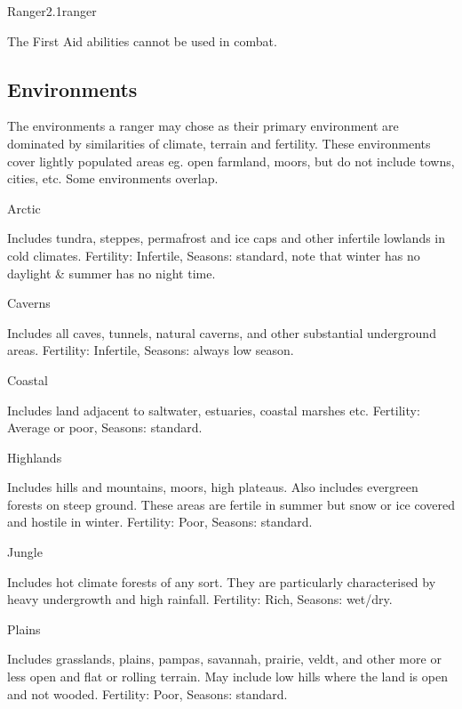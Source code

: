 \begin{skill}{Ranger}{2.1}{ranger}
\begin{Description}
The First Aid abilities cannot be used in combat.
\end{Description}

\subsection{Environments}
\label{ranger:speciality}

The environments a ranger may chose as their primary environment are
dominated by similarities of climate, terrain and fertility.  These
environments cover lightly populated areas eg. open farmland, moors,
but do not include towns, cities, etc.  Some environments overlap.

\begin{Description}
\item[Arctic]

Includes tundra, steppes, permafrost and ice caps and other infertile lowlands in cold climates.  
Fertility: Infertile, Seasons: standard, note that winter has no daylight \& summer has no night time.

\item[Caverns]

Includes all caves, tunnels, natural caverns, and other substantial underground areas.
Fertility: Infertile, Seasons: always low season.

\item[Coastal]

Includes land adjacent to saltwater, estuaries, coastal marshes etc.
Fertility: Average or poor, Seasons: standard.

\item[Highlands]

Includes hills and mountains, moors, high plateaus.  Also includes
evergreen forests on steep ground.  These areas are fertile in summer
but snow or ice covered and hostile in winter.  Fertility: Poor,
Seasons: standard.

\item[Jungle]

Includes hot climate forests of any sort.  They are particularly
characterised by heavy undergrowth and high rainfall.  Fertility:
Rich, Seasons: wet/dry.

\item[Plains]

Includes grasslands, plains, pampas, savannah, prairie, veldt, and
other more or less open and flat or rolling terrain.  May include low
hills where the land is open and not wooded.  Fertility: Poor,
Seasons: standard.


\end{Description}
\end{skill}
